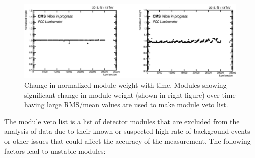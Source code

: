 \begin{figure}[!htp]
\centering
\includegraphics[width=1\textwidth]{ashish_thesis/good_bad_modules_1.png}
\caption[Good/Bad Module Weights]{%
   Change in normalized module weight with time. Modules showing significant change in module weight (shown in right figure) over time having large RMS/mean values are used to make module veto list.
}
\label{fig:goodbadmodules}
\end{figure}

The module veto list is a list of detector modules that are excluded from the analysis of data due to their known or suspected high rate of background events or other issues that could affect the accuracy of the measurement. The following factors lead to unstable modules: 

